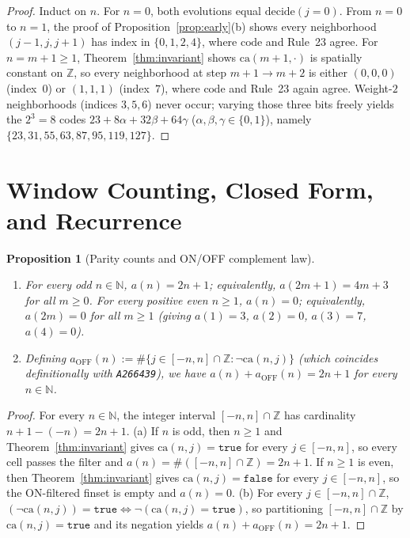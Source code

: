 \documentclass[11pt]{article}
\newtheorem{proposition}[theorem]{Proposition}
\theoremstyle{definition}
\newcommand{\N}{\mathbb{N}}
\newcommand{\Z}{\mathbb{Z}}
\newcommand{\seq}[1]{\texttt{#1}}
\newcommand{\ca}{\mathrm{ca}}
\newcommand{\btrue}{\mathtt{true}}
\newcommand{\bfalse}{\mathtt{false}}
\begin{document}
\begin{proof}
Induct on $n$. For $n = 0$, both evolutions equal $\mathrm{decide}(j = 0)$. From $n = 0$ to $n = 1$, the proof of Proposition~\ref{prop:early}(b) shows every neighborhood $(j - 1, j, j + 1)$ has index in $\{0, 1, 2, 4\}$, where $\mathrm{code}$ and Rule~23 agree. For $n = m + 1 \ge 1$, Theorem~\ref{thm:invariant} shows $\ca(m + 1, \cdot)$ is spatially constant on $\Z$, so every neighborhood at step $m + 1 \to m + 2$ is either $(0, 0, 0)$ (index~$0$) or $(1, 1, 1)$ (index~$7$), where $\mathrm{code}$ and Rule~23 again agree. Weight-$2$ neighborhoods (indices $3, 5, 6$) never occur; varying those three bits freely yields the $2^3 = 8$ codes $23 + 8\alpha + 32\beta + 64\gamma$ ($\alpha, \beta, \gamma \in \{0, 1\}$), namely $\{23, 31, 55, 63, 87, 95, 119, 127\}$.
\end{proof}

\section{Window Counting, Closed Form, and Recurrence}

\begin{proposition}[Parity counts and ON/OFF complement law]
\label{prop:counts}
\leavevmode
\begin{enumerate}
\item[\textup{(a)}] For every odd $n \in \N$, $a(n) = 2n + 1$; equivalently, $a(2m + 1) = 4m + 3$ for all $m \ge 0$. For every positive even $n \ge 1$, $a(n) = 0$; equivalently, $a(2m) = 0$ for all $m \ge 1$ (giving $a(1) = 3$, $a(2) = 0$, $a(3) = 7$, $a(4) = 0$).
\item[\textup{(b)}] Defining $a_{\mathrm{OFF}}(n) := \#\{j \in [-n, n] \cap \Z : \neg\ca(n, j)\}$ (which coincides definitionally with \seq{A266439}), we have $a(n) + a_{\mathrm{OFF}}(n) = 2n + 1$ for every $n \in \N$.
\end{enumerate}
\end{proposition}

\begin{proof}
For every $n \in \N$, the integer interval $[-n, n] \cap \Z$ has cardinality $n + 1 - (-n) = 2n + 1$.
(a) If $n$ is odd, then $n \ge 1$ and Theorem~\ref{thm:invariant} gives $\ca(n, j) = \btrue$ for every $j \in [-n, n]$, so every cell passes the filter and $a(n) = \#([-n, n] \cap \Z) = 2n + 1$. If $n \ge 1$ is even, then Theorem~\ref{thm:invariant} gives $\ca(n, j) = \bfalse$ for every $j \in [-n, n]$, so the ON-filtered finset is empty and $a(n) = 0$.
(b) For every $j \in [-n, n] \cap \Z$, $(\neg\ca(n, j)) = \btrue \iff \neg(\ca(n, j) = \btrue)$, so partitioning $[-n, n] \cap \Z$ by $\ca(n, j) = \btrue$ and its negation yields $a(n) + a_{\mathrm{OFF}}(n) = 2n + 1$.
\end{proof}
\end{document}
